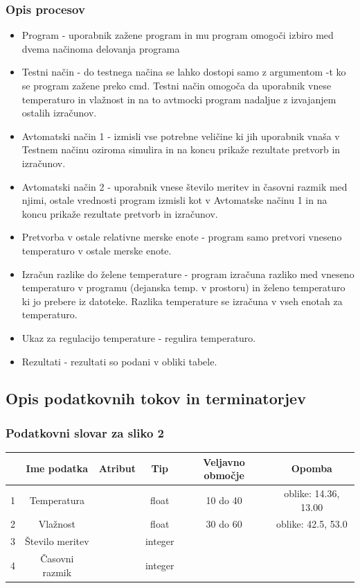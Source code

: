 \documentclass[a4paper,12pt]{article}
\begin{document}
			\subsubsection{Opis procesov}
		
				\begin{itemize}
					\item Program - uporabnik zažene program in mu program omogoči izbiro med dvema načinoma delovanja programa
					\item Testni način - do testnega načina se lahko dostopi samo z argumentom -t ko se program zažene preko cmd.
						Testni način omogoča da uporabnik vnese temperaturo in vlažnost in na to avtmocki program nadaljue z izvajanjem
						ostalih izračunov.
					\item Avtomatski način 1 - izmisli vse potrebne veličine ki jih uporabnik vnaša v Testnem načinu oziroma simulira in
						na koncu prikaže rezultate pretvorb in izračunov.
					\item Avtomatski način 2 - uporabnik vnese število meritev in časovni razmik med njimi, ostale vrednosti program
						izmisli kot v Avtomatske načinu 1 in na koncu prikaže rezultate pretvorb in izračunov.
					\item Pretvorba v ostale relativne merske enote - program samo pretvori vneseno temperaturo v ostale merske enote.
					\item Izračun razlike do želene temperature - program izračuna razliko med vneseno temperaturo v programu 
						(dejanska temp. v prostoru) in želeno temperaturo ki jo prebere iz datoteke. Razlika temperature se izračuna
						v vseh enotah za temperaturo.
					\item Ukaz za regulacijo temperature - regulira temperaturo.
					\item Rezultati - rezultati so podani v obliki tabele.
				\end{itemize}


		\subsection{Opis podatkovnih tokov in terminatorjev}

			\subsubsection{Podatkovni slovar za sliko 2}

			\begin{center}
			\begin{tabular}{|c|c|c|c|c|c|}
					\hline 
					 &Ime podatka&Atribut&Tip&Veljavno območje&Opomba\\
					\hline
					1&Temperatura&&float&10 do 40&oblike: 14.36, 13.00\\
					\hline
					2&Vlažnost&&float&30 do 60&oblike: 42.5, 53.0\\
					\hline
					3&Število meritev&&integer&&\\
					\hline
					4&Časovni razmik&&integer&&\\
					\hline
			\end{tabular}
			\end{center}
\end{document}

